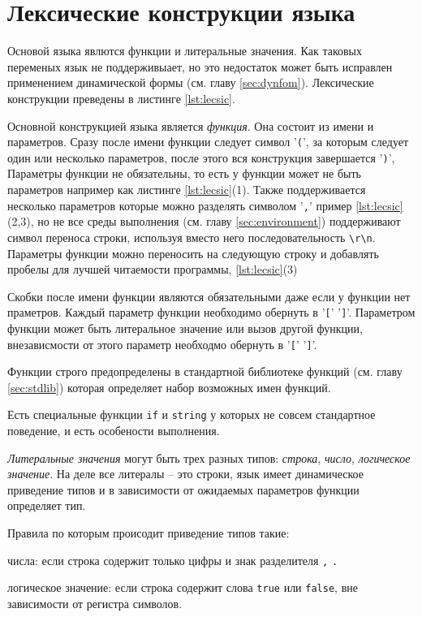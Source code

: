 \documentclass[../index.tex]{subfiles}
\begin{document}
\section{Лексические конструкции языка}
Основой языка явлются функции и литеральные значения. Как таковых переменых язык не поддерживыает, 
но это недостаток может быть исправлен применением динамической формы (см. главу \ref{sec:dynfom}). 
Лексические конструкции преведены в листинге \ref{lst:lecsic}. 

Основной конструкцией языка является \textit{функция}. Она состоит из имени и параметров. 
Сразу после имени функции следует символ '\verb|(|', за которым следует один или 
несколько параметров, после этого вся конструкция завершается '\verb|)|', 
Параметры функции не обязательны, то есть у функции может не быть параметров 
например как листинге \ref{lst:lecsic}(1). 
Также поддерживается несколько параметров которые можно разделять символом '\verb|,|'
пример \ref{lst:lecsic}(2,3), но не все среды выполнения (см. главу \ref{sec:environment}) 
поддерживают символ переноса строки, используя вместо него последовательность \verb|\r\n|.
Параметры функции можно переносить на следующую строку и добавлять пробелы для 
лучшей читаемости программы, \ref{lst:lecsic}(3)

Скобки после имени функции являются обязательными даже если у функции нет праметров.
Каждый параметр функции необходимо обернуть в '\verb|[|' '\verb|]|'.
Параметром функции может быть литеральное значение или вызов другой функции, внезависмости от этого 
параметр необходмо обернуть в '\verb|[|' '\verb|]|'.

Функции строго предопределены в стандартной библиотеке функций (см. главу \ref{sec:stdlib}) которая определяет набор возможных имен функций.

Есть специальные функции \verb|if| и \verb|string| у которых не совсем стандартное поведение,
и есть особености выполнения.

\textit{Литеральные значения} могут быть трех разных типов: \textit{строка}, \textit{число},
\textit{логическое значение}. На деле все литералы -- это строки, язык имеет динамическое 
приведение типов и в зависимости от ожидаемых параметров функции определяет тип.

Правила по которым происодит приведение типов такие:

числа: если строка содержит только цифры и знак разделителя \verb|,| \verb|.| 

логическое значение: если строка содержит слова \verb|true| или \verb|false|, вне зависимости от регистра символов.
\end{document}
